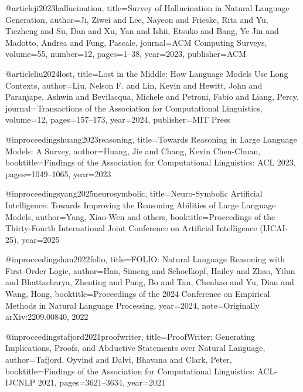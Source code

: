 

@article{ji2023hallucination,
  title={Survey of Hallucination in Natural Language Generation},
  author={Ji, Ziwei and Lee, Nayeon and Frieske, Rita and Yu, Tiezheng and Su, Dan and Xu, Yan and Ishii, Etsuko and Bang, Ye Jin and Madotto, Andrea and Fung, Pascale},
  journal={ACM Computing Surveys},
  volume={55},
  number={12},
  pages={1--38},
  year={2023},
  publisher={ACM}
}

@article{liu2024lost,
  title={Lost in the Middle: How Language Models Use Long Contexts},
  author={Liu, Nelson F. and Lin, Kevin and Hewitt, John and Paranjape, Ashwin and Bevilacqua, Michele and Petroni, Fabio and Liang, Percy},
  journal={Transactions of the Association for Computational Linguistics},
  volume={12},
  pages={157--173},
  year={2024},
  publisher={MIT Press}
}

@inproceedings{huang2023reasoning,
  title={Towards Reasoning in Large Language Models: A Survey},
  author={Huang, Jie and Chang, Kevin Chen-Chuan},
  booktitle={Findings of the Association for Computational Linguistics: ACL 2023},
  pages={1049--1065},
  year={2023}
}


@inproceedings{yang2025neurosymbolic,
  title={Neuro-Symbolic Artificial Intelligence: Towards Improving the Reasoning Abilities of Large Language Models},
  author={Yang, Xiao-Wen and others},
  booktitle={Proceedings of the Thirty-Fourth International Joint Conference on Artificial Intelligence (IJCAI-25)},
  year={2025}
}


@inproceedings{han2022folio,
  title={{FOLIO}: Natural Language Reasoning with First-Order Logic},
  author={Han, Simeng and Schoelkopf, Hailey and Zhao, Yilun and Bhattacharya, Zhenting and Pang, Bo and Tan, Chenhao and Yu, Dian and Wang, Hong},
  booktitle={Proceedings of the 2024 Conference on Empirical Methods in Natural Language Processing},
  year={2024},
  note={Originally arXiv:2209.00840, 2022}
}

@inproceedings{tafjord2021proofwriter,
  title={{ProofWriter}: Generating Implications, Proofs, and Abductive Statements over Natural Language},
  author={Tafjord, Oyvind and Dalvi, Bhavana and Clark, Peter},
  booktitle={Findings of the Association for Computational Linguistics: ACL-IJCNLP 2021},
  pages={3621--3634},
  year={2021}
}

